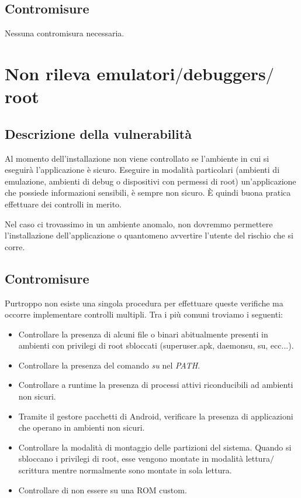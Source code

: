 \subsection{Contromisure}
Nessuna contromisura necessaria.

\section{Non rileva emulatori$/$debuggers$/$root}

\subsection{Descrizione della vulnerabilità}
Al momento dell'installazione non viene controllato se l'ambiente in cui si eseguirà l'applicazione è sicuro. Eseguire in modalità particolari (ambienti di emulazione, ambienti di debug o dispositivi con permessi di root) un'applicazione che possiede informazioni sensibili, è sempre non sicuro. È quindi buona pratica effettuare dei controlli in merito. 

Nel caso ci trovassimo in un ambiente anomalo, non dovremmo permettere l'installazione dell'applicazione o quantomeno avvertire l'utente del rischio che si corre. 

\subsection{Contromisure}
Purtroppo non esiste una singola procedura per effettuare queste verifiche ma occorre implementare controlli multipli. Tra i più comuni troviamo i seguenti:
\begin{itemize}
	\item Controllare la presenza di alcuni file o binari abitualmente presenti in ambienti con privilegi di root sbloccati (superuser.apk, daemonsu, su, ecc...).
	\item Controllare la presenza del comando \emph{su} nel \emph{PATH}.
	\item Controllare a runtime la presenza di processi attivi riconducibili ad ambienti non sicuri.
	\item Tramite il gestore pacchetti di Android, verificare la presenza di applicazioni che operano in ambienti non sicuri.
	\item Controllare la modalità di montaggio delle partizioni del sistema. Quando si sbloccano i privilegi di root, esse vengono montate in modalità lettura$/$scrittura mentre normalmente sono montate in sola lettura.
	\item Controllare di non essere su una ROM custom. 
\end{itemize} 
